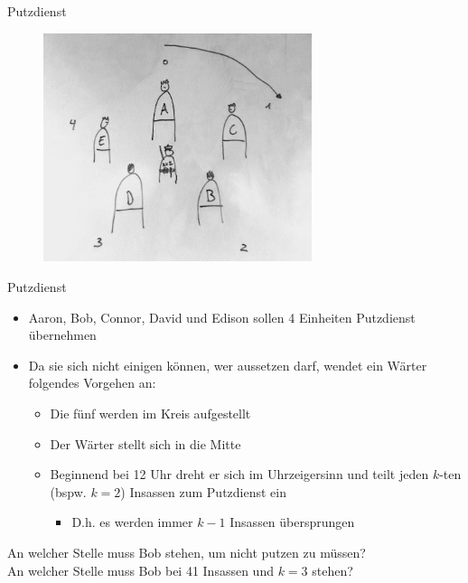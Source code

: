 \documentclass{beamer}
\begin{document}

\begin{frame}{Putzdienst}
	\begin{figure}
		\includegraphics[width=0.7\textwidth]{images/putzdienst}
	\end{figure}
\end{frame}

\begin{frame}{Putzdienst}
	\begin{itemize}
		\item Aaron, Bob, Connor, David und Edison sollen 4 Einheiten Putzdienst übernehmen
		\item Da sie sich nicht einigen können, wer aussetzen darf, wendet ein Wärter folgendes Vorgehen an:
		\begin{itemize}
			\item Die fünf werden im Kreis aufgestellt
			\item Der Wärter stellt sich in die Mitte
			\item Beginnend bei 12 Uhr dreht er sich im Uhrzeigersinn und teilt jeden $k$-ten (bspw. $k = 2$) Insassen zum Putzdienst ein
			\begin{itemize}
				\item D.h. es werden immer $k - 1$ Insassen übersprungen
			\end{itemize}
		\end{itemize}
	\end{itemize}

	An welcher Stelle muss Bob stehen, um nicht putzen zu müssen?\\
	\pause
	An welcher Stelle muss Bob bei 41 Insassen und $k = 3$ stehen?
\end{frame}
\end{document}
